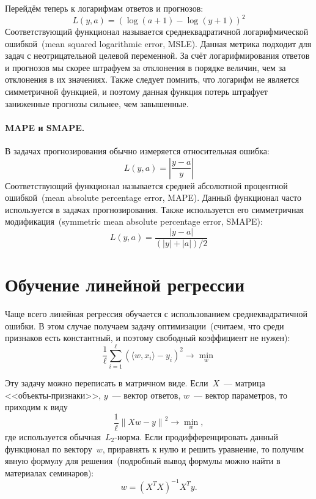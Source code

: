 \documentclass[12pt,fleqn]{article}
\begin{document}
Перейдём теперь к логарифмам ответов и прогнозов:
\[
    L(y, a) = (\log(a + 1) - \log(y + 1))^2
\]
Соответствующий функционал называется среднеквадратичной логарифмической ошибкой~(mean
squared logarithmic error, MSLE).
Данная метрика подходит для задач с неотрицательной целевой переменной.
За счёт логарифмирования ответов и прогнозов мы скорее штрафуем за отклонения
в порядке величин, чем за отклонения в их значениях.
Также следует помнить, что логарифм не является симметричной функцией,
и поэтому данная функция потерь штрафует заниженные прогнозы сильнее,
чем завышенные.

\paragraph{MAPE и SMAPE.}

В задачах прогнозирования обычно измеряется относительная ошибка:
\[
    L(y, a) = \left| \frac{y - a}{y} \right|
\]
Соответствующий функционал называется средней абсолютной процентной ошибкой~(mean
absolute percentage error, MAPE).
Данный функционал часто используется в задачах прогнозирования.
Также используется его симметричная модификация~(symmetric mean absolute percentage error, SMAPE):
\[
    L(y, a) = \frac{|y - a|}{(|y| + |a|) / 2}
\]

\section{Обучение линейной регрессии}

Чаще всего линейная регрессия обучается с использованием среднеквадратичной ошибки.
В этом случае получаем задачу оптимизации~(считаем, что среди признаков есть константный, и поэтому
свободный коэффициент не нужен):
\[
    \frac{1}{\ell}
    \sum_{i = 1}^{\ell} \left(
        \langle w, x_i \rangle - y_i
    \right)^2
    \to
    \min_{w}
\]

Эту задачу можно переписать в матричном виде.
Если~$X$~--- матрица <<объекты-признаки>>, $y$~--- вектор ответов, $w$~--- вектор параметров,
то приходим к виду
\begin{equation}
\label{eq:lsq}
    \frac{1}{\ell}
    \left\|
        Xw - y
    \right\|^2
    \to
    \min_{w},
\end{equation}
где используется обычная~$L_2$-норма.
Если продифференцировать данный функционал по вектору~$w$, приравнять к нулю
и решить уравнение, то получим явную формулу для решения~(подробный вывод формулы можно
найти в материалах семинаров):
\[
    w
    =
    (X^T X)^{-1} X^T y.
\]
\end{document}
